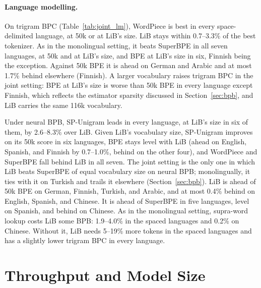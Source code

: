 \documentclass[pdflatex,sn-apa]{sn-jnl}
\begin{document}
\paragraph{Language modelling.}
On trigram BPC (Table~\ref{tab:joint_lm}), WordPiece is best in every
space-delimited language, at 50k or at LiB's size. LiB stays within
0.7--3.3\% of the best tokenizer. As in the monolingual setting, it beats
SuperBPE in all seven languages, at 50k and at LiB's size, and BPE at
LiB's size in six, Finnish being
the exception. Against 50k BPE it is ahead on German and Arabic and at most
1.7\% behind elsewhere (Finnish). A larger vocabulary raises trigram BPC in
the joint setting: BPE at LiB's size is worse than 50k BPE in every language
except Finnish, which reflects the estimator sparsity discussed in
Section~\ref{sec:bpb}, and LiB carries the same 116k vocabulary.

Under neural BPB, SP-Unigram leads in every language, at LiB's size in six
of them, by 2.6--8.3\% over LiB. Given LiB's vocabulary size, SP-Unigram
improves on its 50k score in six languages, BPE stays level with LiB (ahead on English,
Spanish, and Finnish by 0.7--1.0\%, behind on the other four), and WordPiece
and SuperBPE fall behind LiB in all seven. The joint setting is the only
one in which LiB beats SuperBPE of equal vocabulary size on neural BPB;
monolingually, it ties with it on Turkish and trails it elsewhere
(Section~\ref{sec:bpb}). LiB is ahead of 50k BPE on German, Finnish, Turkish,
and Arabic, and at most 0.4\% behind on English, Spanish, and Chinese. It is
ahead of SuperBPE in five languages, level on Spanish, and behind on Chinese.
As in the monolingual setting, supra-word lookup costs LiB some BPB: 1.9--4.0\%
in the spaced languages and 0.2\% on Chinese. Without it, LiB needs 5--19\%
more tokens in the spaced languages and has a slightly lower trigram BPC in
every language.

\section{Throughput and Model Size}
\label{sec:speed}
\end{document}
